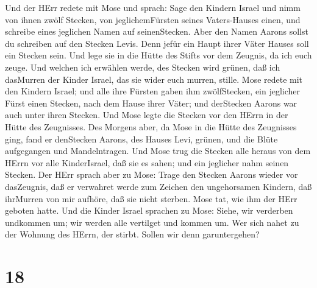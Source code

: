  Und der HErr redete mit Mose und sprach:  Sage
den Kindern Israel und nimm von ihnen zwölf Stecken, von
jeglichemFürsten seines Vaters-Hauses einen, und schreibe eines
jeglichen Namen auf seinenStecken.  Aber den Namen Aarons
sollst du schreiben auf den Stecken Levis. Denn jefür ein Haupt ihrer
Väter Hauses soll ein Stecken sein.  Und lege sie in die
Hütte des Stifts vor dem Zeugnis, da ich euch zeuge.  Und
welchen ich erwählen werde, des Stecken wird grünen, daß ich dasMurren
der Kinder Israel, das sie wider euch murren, stille.  Mose
redete mit den Kindern Israel; und alle ihre Fürsten gaben ihm
zwölfStecken, ein jeglicher Fürst einen Stecken, nach dem Hause ihrer
Väter; und derStecken Aarons war auch unter ihren Stecken. 
Und Mose legte die Stecken vor den HErrn in der Hütte des Zeugnisses.
 Des Morgens aber, da Mose in die Hütte des Zeugnisses ging,
fand er denStecken Aarons, des Hauses Levi, grünen, und die Blüte
aufgegangen und Mandelntragen.  Und Mose trug die Stecken
alle heraus von dem HErrn vor alle KinderIsrael, daß sie es sahen; und
ein jeglicher nahm seinen Stecken.  Der HErr sprach aber zu
Mose: Trage den Stecken Aarons wieder vor dasZeugnis, daß er verwahret
werde zum Zeichen den ungehorsamen Kindern, daß ihrMurren von mir
aufhöre, daß sie nicht sterben.  Mose tat, wie ihm der HErr
geboten hatte.  Und die Kinder Israel sprachen zu Mose:
Siehe, wir verderben undkommen um; wir werden alle vertilget und kommen
um.  Wer sich nahet zu der Wohnung des HErrn, der stirbt.
Sollen wir denn garuntergehen?

\hypertarget{section-17}{%
\section{18}\label{section-17}}

